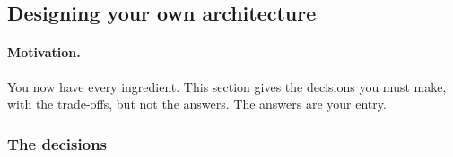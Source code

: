 \subsection{Designing your own architecture}\label{sec:design}

\paragraph{Motivation.} You now have every ingredient. This section gives
the decisions you must make, with the trade-offs, but not the answers. The
answers are your entry.

\subsubsection{The decisions}
